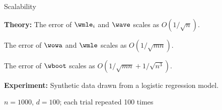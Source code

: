 \begin{frame}[fragile]{Scalability}
\vspace{0.15in}

\textbf{Theory:}
The error of $\wmle_i$ and $\wave$ scales as $O(1/\sqrt{n})$.

\hspace{0.55in} The error of $\wowa$ and $\wmle$ scales as $O(1/\sqrt{mn})$.

\hspace{0.55in} The error of $\wboot$ scales as $O(1/\sqrt{mn} + 1/\sqrt{n^3})$.

\vspace{0.15in}

\textbf{Experiment:}
Synthetic data drawn from a logistic regression model.

$n=1000$, $d=100$; each trial repeated 100 times

\begin{center}
\newcommand{\mklambdaplot}[4]{
\begin{tikzpicture}
    [ yscale=0.8
    ]
#3
\begin{axis}
    [ width=4in
    , height=2.3in
    , ymode=log
    , xmin=1
    , xmax=100
#2
    ]


\end{axis}
\end{tikzpicture}}
\end{center}
\end{frame}
